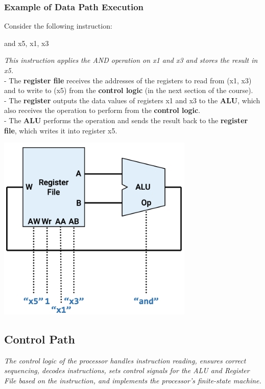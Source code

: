 \documentclass[12pt,openany]{book}
\begin{document}
\subsubsection{Example of Data Path Execution}
\footnotesize
\begin{minipage}[htp]{0.55\textwidth}
Consider the following instruction:
\begin{assembly}
and x5, x1, x3
\end{assembly}
\textit{This instruction applies the AND operation on x1 and x3 and stores the result in x5.}\\
- The \textbf{register file} receives the addresses of the registers to read from (x1, x3) and to write to (x5) from the \textbf{control logic} (in the next section of the course).\\ \vspace*{5px}
- The \textbf{register} outputs the data values of registers x1 and x3 to the \textbf{ALU}, which also receives the operation to perform from the \textbf{control logic}.\\ \vspace*{5px}
- The\textbf{ ALU} performs the operation and sends the result back to the \textbf{register file}, which writes it into register x5.\\
\end{minipage}
\hfill
\vline
\hfill
\begin{minipage}[htp]{0.4\textwidth}
	\begin{center}
		\includegraphics[width=0.7\textwidth]{circuits/19.4.1_3.png}
	\end{center}
\end{minipage}	

\subsection{Control Path}
\textit{The control logic of the processor handles instruction reading, ensures correct sequencing, decodes instructions, sets control signals for the ALU and Register File based on the instruction, and implements the processor's finite-state machine.}
\end{document}
